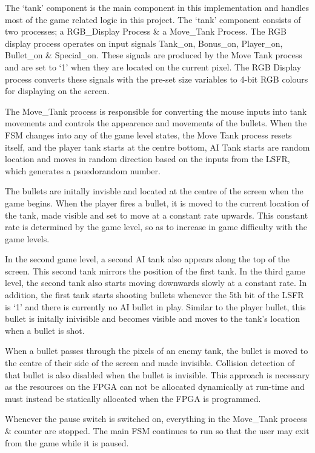 \documentclass{article}
\begin{document}
The `tank' component is the main component in this implementation and handles most of the game related logic in this project. The `tank' component consists of two processes; a RGB\_Display Process \& a Move\_Tank Process. The RGB display process operates on input signals Tank\_on, Bonus\_on, Player\_on, Bullet\_on \& Special\_on. These signals are produced by the Move Tank process and are set to `1' when they are located on the current pixel. The RGB Display process converts these signals with the pre-set size variables to 4-bit RGB colours for displaying on the screen.

The Move\_Tank process is responsible for converting the mouse inputs into tank movements and controls the appearence and movements of the bullets. When the FSM changes into any of the game level states, the Move Tank process resets itself, and the player tank starts at the centre bottom, AI Tank starts are random location and moves in random direction based on the inputs from the LSFR, which generates a psuedorandom number. 

The bullets are initally invisble and located at the centre of the screen when the game begins. When the player fires a bullet, it is moved to the current location of the tank, made visible and set to move at a constant rate upwards. This constant rate is determined by the game level, so as to increase in game difficulty with the game levels.

In the second game level, a second AI tank also appears along the top of the screen. This second tank mirrors the position of the first tank. In the third game level, the second tank also starts moving downwards slowly at a constant rate. In addition, the first tank starts shooting bullets whenever the 5th bit of the LSFR is `1' and there is currently no AI bullet in play. Similar to the player bullet, this bullet is initally inivisible and becomes visible and moves to the tank's location when a bullet is shot.

When a bullet passes through the pixels of an enemy tank, the bullet is moved to the centre of their side of the screen and made invisible. Collision detection of that bullet is also disabled when the bullet is invisible. This approach is necessary as the resources on the FPGA can not be allocated dynamically at run-time and must instead be statically allocated when the FPGA is programmed.

Whenever the pause switch is switched on, everything in the Move\_Tank process \& counter are stopped. The main FSM continues to run so that the user may exit from the game while it is paused.
\end{document}
